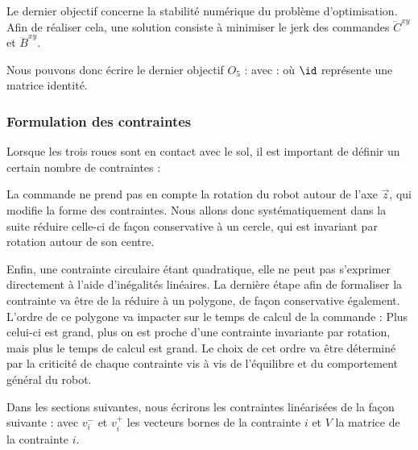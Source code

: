 					Le dernier objectif concerne la stabilité numérique du problème d'optimisation.
					Afin de réaliser cela, une solution consiste à minimiser le jerk des commandes $\dddot{C}^{xy}$ et $\dddot{B}^{xy}$.
					
					Nous pouvons donc écrire le dernier objectif $O_5$ :
					avec : 
					où $\id$ représente une matrice identité.

			\subsubsection{Formulation des contraintes}
			\label{ctr_intro_3_roues}

				Lorsque les trois roues sont en contact avec le sol, il est important de définir un certain nombre de contraintes :
				
				La commande ne prend pas en compte la rotation du robot autour de l'axe $\vec{z}$, qui modifie la forme des contraintes.
				Nous allons donc systématiquement dans la suite réduire celle-ci de façon conservative à un cercle, qui est invariant par rotation autour de son centre.
				
				Enfin, une contrainte circulaire étant quadratique, elle ne peut pas s'exprimer directement à l'aide d'inégalités linéaires.
				La dernière étape afin de formaliser la contrainte va être de la réduire à un polygone, de façon conservative également.
				L'ordre de ce polygone va impacter sur le temps de calcul de la commande : Plus celui-ci est grand, plus on est proche d'une contrainte invariante par rotation, mais plus le temps de calcul est grand.
				Le choix de cet ordre va être déterminé par la criticité de chaque contrainte vis à vis de l'équilibre et du comportement général du robot.
				
				
				
				Dans les sections suivantes, nous écrirons les contraintes linéarisées de la façon suivante :
				avec $v^-_i$ et $v^+_i$ les vecteurs bornes de la contrainte $i$ et $V$ la matrice de la contrainte $i$.
				

